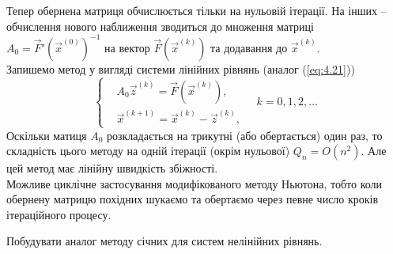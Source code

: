 Тепер обернена матриця обчислюється тільки на нульовій ітерації. На інших -- обчислення нового наближення зводиться до множення матриці $A_0 = \vec F'\left(\vec x^{(0)}\right)^{-1}$ на вектор $\vec F\left(\vec x^{(k)}\right)$ та додавання до $\vec x^{(k)}$. \\

Запишемо метод у вигляді системи лінійних рівнянь (аналог (\ref{eq:4.21}))
\begin{equation}
	\label{eq:4.22}
	\left\{
		\begin{aligned}
			& A_0 \vec z^{(k)} = \vec F\left(\vec x^{(k)}\right), \\
			& \vec x^{(k + 1)} = \vec x^{(k)} - \vec z^{(k)},
		\end{aligned}
		\quad k=0,1,2,\ldots
	\right.
\end{equation}
Оскільки матиця $A_0$ розкладається на трикутні (або обертається) один раз, то складність цього методу на одній ітерації (окрім нульової) $Q_n = O(n^2)$. Але цей метод має лінійну швидкість збіжності. \\

Можливе циклічне застосування модифікованого методу Ньютона, тобто коли обернену матрицю похідних шукаємо та обертаємо через певне число кроків ітераційного процесу. \\

\begin{problem}
	Побудувати аналог методу січних для систем нелінійних рівнянь.
\end{problem}